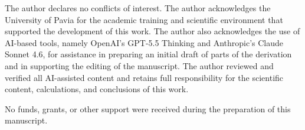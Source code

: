 \documentclass[
  aps,
  prd,
  twocolumn,
  nofootinbib,
  superscriptaddress,
  longbibliography
]{revtex4-2}
\begin{document}
\begin{acknowledgments}
The author declares no conflicts of interest.
The author acknowledges the University of Pavia for the academic
training and scientific environment that supported the development of
this work. The author also acknowledges the use of AI-based tools,
namely OpenAI’s GPT-5.5 Thinking and Anthropic’s Claude Sonnet 4.6,
for assistance in preparing an initial draft of parts of the derivation
and in supporting the editing of the manuscript. The author reviewed
and verified all AI-assisted content and retains full responsibility
for the scientific content, calculations, and conclusions of this work.

No funds, grants, or other support were received during the preparation
of this manuscript.
\end{acknowledgments}


\end{document}

